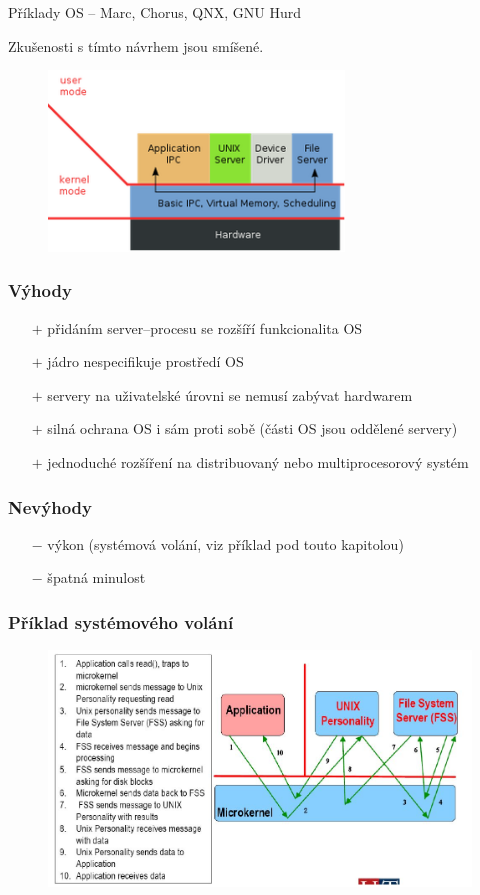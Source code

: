 Příklady OS -- Marc, Chorus, QNX, GNU Hurd

Zkušenosti s tímto návrhem jsou smíšené.
\begin{figure}[H]
\centering
\includegraphics[width=0.7\textwidth]{assets/3_microkernel}
\end{figure}
\subsubsection*{Výhody}
\begin{itemize}
	\item[$+$] přidáním server--procesu se rozšíří funkcionalita OS
	\item[$+$] jádro nespecifikuje prostředí OS
	\item[$+$] servery na uživatelské úrovni se nemusí zabývat hardwarem
	\item[$+$] silná ochrana OS i sám proti sobě (části OS jsou oddělené servery)
	\item[$+$] jednoduché rozšíření na distribuovaný nebo multiprocesorový systém
\end{itemize}
\subsubsection*{Nevýhody}
\begin{itemize}
	\item[$-$] výkon (systémová volání, viz příklad pod touto kapitolou)
	\item[$-$] špatná minulost
\end{itemize}

\subsubsection{Příklad systémového volání}
\begin{figure}[H]
\centering
\includegraphics[width=1\textwidth]{assets/3_sys_call}
\end{figure}